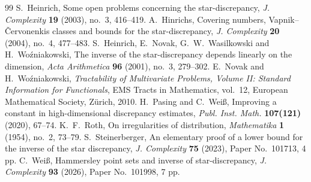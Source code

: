 \documentclass[10pt,a4paper]{amsart}
\newcommand{\1}{\mathbf{1}}
\begin{document}
\begin{thebibliography}{99}
 S.~Heinrich, \newblock Some open problems concerning the star-discrepancy, \newblock \emph{J. Complexity} \textbf{19} (2003), no.~3, 416--419.
 A.~Hinrichs, \newblock Covering numbers, Vapnik--\v{C}ervonenkis classes and bounds for the star-discrepancy, \newblock \emph{J. Complexity} \textbf{20} (2004), no.~4, 477--483.
 S.~Heinrich, E.~Novak, G.~W.~Wasilkowski and H.~Wo\'{z}niakowski, \newblock The inverse of the star-discrepancy depends linearly on the dimension, \newblock \emph{Acta Arithmetica} \textbf{96} (2001), no.~3, 279--302.
 E.~Novak and H.~Wo\'{z}niakowski, \newblock \emph{Tractability of Multivariate Problems, Volume II: Standard Information for Functionals}, \newblock EMS Tracts in Mathematics, vol.~12, European Mathematical Society, Z\"urich, 2010.
 H.~Pasing and C.~Wei\ss, \newblock Improving a constant in high-dimensional discrepancy estimates, \newblock \emph{Publ. Inst. Math.} \textbf{107(121)} (2020), 67--74.
 K.~F.~Roth, \newblock On irregularities of distribution, \newblock \emph{Mathematika} \textbf{1} (1954), no.~2, 73--79.
 S.~Steinerberger, \newblock An elementary proof of a lower bound for the inverse of the star discrepancy, \newblock \emph{J. Complexity} \textbf{75} (2023), Paper No.~101713, 4 pp.
 C.~Wei\ss, Hammersley point sets and inverse of star-discrepancy, \newblock \emph{J. Complexity} \textbf{93} (2026), Paper No.~101998, 7 pp.
\end{thebibliography}
\end{document}
